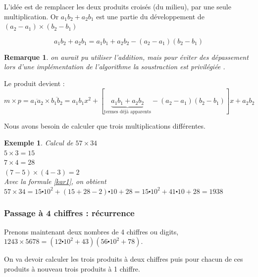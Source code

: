 \documentclass[11pt,french]{article}
\theoremstyle{plain}
\newtheorem*{remarque}{Remarque}
\newtheorem*{exemple}{Exemple}
\newcommand{\x}{\times}
\newcommand{\cd}{\centerdot}
\begin{document}
L'idée est de remplacer les deux produits croisés (du milieu), par une seule multiplication. Or $a_1 b_2 +a_2 b_1$ est une partie du développement de $\left( a_2 - a_1 \right)\x \left( b_2 - b_1 \right) $ 

 \[  a_1 b_2 +a_2 b_1 =  a_1 b_1 +a_2 b_2 - \left( a_2 - a_1 \right) \left( b_2 - b_1 \right)  \]

\begin{remarque}
    on aurait pu utiliser l'addition, mais pour éviter des dépassement lors d'une implémentation de l'algorithme la soustraction est privilégiée .
\end{remarque}

Le produit devient :
\begin{equation}
m\x p = \overline{a_1 a_2}\x \overline{b_1 b_2} =  a_1 b_1 x^2 + [ \underbrace{a_1 b_1 +a_2 b_2}_{\textrm{termes déjà apparents}} - \left( a_2 - a_1 \right) \left( b_2 - b_1 \right)  ]x+a_2 b_2  \label{kar1}
\end{equation}

Nous avons besoin de calculer que trois multiplications différentes.
\begin{exemple}
    Calcul de $57 \times 34$\\
    $5\x3=15$\\
    $7\x4=28$\\
    $(7-5)\x(4-3)=2$\\
    Avec la formule \eqref{kar1}, on obtient   $57 \times 34=15\cd 10^2+\left( 15+28-2 \right) \cd 10 + 28=15\cd 10^2 + 41\cd 10 + 28=1938$
\end{exemple}

\subsubsection{Passage à 4 chiffres : récurrence }
Prenons maintenant deux  nombres de 4 chiffres ou digits, $1243\x5678=\left( 12\cd10^2+43\right) \left(56\cd10^2+78 \right) $.

On va devoir calculer les trois produits à deux chiffres puis pour chacun de ces produits à nouveau trois produits à 1 chiffre.

\end{document}
